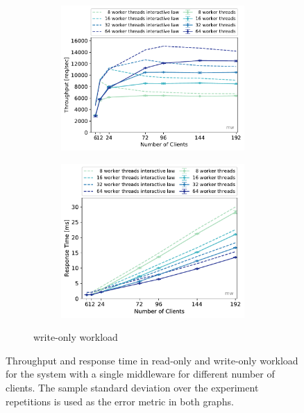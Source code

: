 \documentclass[report.tex]{subfiles}
\begin{document}
\begin{figure}[H]
\begin{subfigure}{\linewidth}
\end{subfigure}
\\[1ex]
\begin{subfigure}{\linewidth}
	\begin{subfigure}[b]{.499\linewidth}
		\centering
		\includegraphics[width=\linewidth]{data/exp31_wo_tp_nc_w.pdf}
	\end{subfigure}\hfill
	\begin{subfigure}[b]{.499\linewidth}
		\centering
		\includegraphics[width=\linewidth]{data/exp31_wo_rt_nc_w.pdf}
	\end{subfigure}
	\caption{write-only workload}\label{exp31_wo_tp_nc}
\end{subfigure}
\caption{Throughput and response time in read-only and write-only workload for the system with a single middleware for different number of clients. The sample standard deviation over the experiment repetitions is used as the error metric in both graphs.}
\end{figure}
\end{document}
